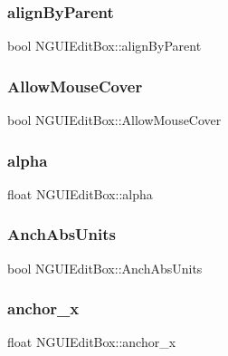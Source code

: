 \subsubsection{\texorpdfstring{align\+By\+Parent}{alignByParent}}
{\footnotesize\ttfamily bool N\+G\+U\+I\+Edit\+Box\+::align\+By\+Parent}

\hypertarget{class_n_g_u_i_edit_box_a3f3ef4724afd733375ce03f109904506}{}\label{class_n_g_u_i_edit_box_a3f3ef4724afd733375ce03f109904506} 
\subsubsection{\texorpdfstring{Allow\+Mouse\+Cover}{AllowMouseCover}}
{\footnotesize\ttfamily bool N\+G\+U\+I\+Edit\+Box\+::\+Allow\+Mouse\+Cover}

\hypertarget{class_n_g_u_i_edit_box_a6ef4cf13ca6434043f0ee11fc16612bd}{}\label{class_n_g_u_i_edit_box_a6ef4cf13ca6434043f0ee11fc16612bd} 
\subsubsection{\texorpdfstring{alpha}{alpha}}
{\footnotesize\ttfamily float N\+G\+U\+I\+Edit\+Box\+::alpha}

\hypertarget{class_n_g_u_i_edit_box_a90130e26baf920fb38c3791a9bb418a2}{}\label{class_n_g_u_i_edit_box_a90130e26baf920fb38c3791a9bb418a2} 
\subsubsection{\texorpdfstring{Anch\+Abs\+Units}{AnchAbsUnits}}
{\footnotesize\ttfamily bool N\+G\+U\+I\+Edit\+Box\+::\+Anch\+Abs\+Units}

\hypertarget{class_n_g_u_i_edit_box_a857c0933fb1dec42f584c5a53372094d}{}\label{class_n_g_u_i_edit_box_a857c0933fb1dec42f584c5a53372094d} 
\subsubsection{\texorpdfstring{anchor\+\_\+x}{anchor\_x}}
{\footnotesize\ttfamily float N\+G\+U\+I\+Edit\+Box\+::anchor\+\_\+x}

